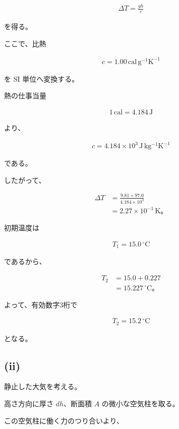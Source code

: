 \documentclass[platex,dvipdfmx,a4paper]{jsarticle}
\begin{document}
\begin{align*}
\Delta T
=
\frac{gh}{c}
\end{align*}

を得る。

ここで、比熱

\begin{align*}
c
=
1.00\,\mathrm{cal\,g^{-1}K^{-1}}
\end{align*}

を SI 単位へ変換する。

熱の仕事当量

\begin{align*}
1\,\mathrm{cal}
=
4.184\,\mathrm{J}
\end{align*}

より、

\begin{align*}
c
=
4.184\times10^3
\,\mathrm{J\,kg^{-1}K^{-1}}
\end{align*}

である。

したがって、

\begin{align*}
\Delta T
&=
\frac{9.81\times97.0}
{4.184\times10^3}
\\
&=
2.27\times10^{-1}\,\mathrm{K}。
\end{align*}

初期温度は

\begin{align*}
T_1=15.0\,^\circ\mathrm{C}
\end{align*}

であるから、

\begin{align*}
T_2
&=
15.0+0.227 \\
&=
15.227\,^\circ\mathrm{C}。
\end{align*}

よって、有効数字3桁で

\begin{align*}
T_2
=
15.2\,^\circ\mathrm{C}
\end{align*}

となる。

\subsection{(ii)}

静止した大気を考える。

高さ方向に厚さ $dh$、断面積 $A$ の微小な空気柱を取る。

この空気柱に働く力のつり合いより、
\end{document}
